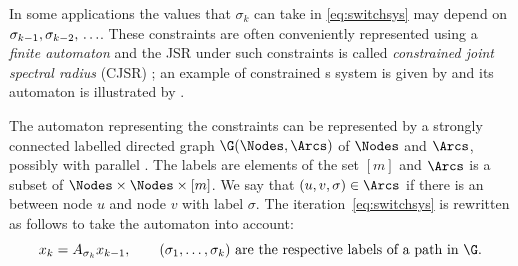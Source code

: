 In some applications the values that $\sigma_k$ can take in \eqref{eq:switchsys} may depend on $\sigma_{k-1}, \sigma_{k-2},\\\ldots$.
These constraints are often conveniently represented using a \emph{finite automaton} and the JSR under such constraints
is called \emph{constrained joint spectral radius} (CJSR) \cite{dai2012gel}; an example of constrained s\witch{} system is given by  and its automaton is illustrated by .



The automaton representing the constraints can be represented by a
strongly connected labelled directed graph $\G(\Nodes,\Arcs)$
of \nodes{} $\Nodes$ and \arcs{} $\Arcs$,
possibly with parallel \arcs{}.  The labels are elements of the set
$[m]$ and $\Arcs$ is a subset of $\Nodes \times \Nodes
\times [m]$.  We say that $(u,v,\sigma) \in \Arcs$ if
there is an \arc{} between node $u$ and node $v$ with label $\sigma$.
The iteration~\ref{eq:switchsys} is rewritten as follows to take the automaton into account:
\begin{equation}
  \label{eq:cswitchsys}
  x_k = A_{\sigma_k} x_{k-1}, \qquad (\sigma_1, \ldots, \sigma_k) \text{ are the respective labels of a path in }\G
  .
\end{equation}

